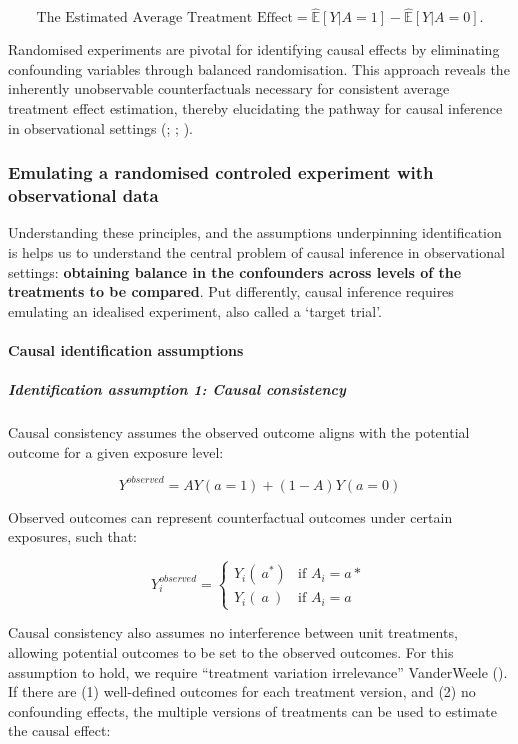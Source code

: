 \documentclass[
  singlecolumn]{article}
\let\oldparagraph\paragraph
\renewcommand{\paragraph}[1]{\oldparagraph{#1}\mbox{}}
\let\oldsubparagraph\subparagraph
\renewcommand{\subparagraph}[1]{\oldsubparagraph{#1}\mbox{}}
\begin{document}
\[
\text{The Estimated Average Treatment Effect} = \widehat{\mathbb{E}}[Y | A = 1] - \widehat{\mathbb{E}}[Y | A = 0].
\]

Randomised experiments are pivotal for identifying causal effects by
eliminating confounding variables through balanced randomisation. This
approach reveals the inherently unobservable counterfactuals necessary
for consistent average treatment effect estimation, thereby elucidating
the pathway for causal inference in observational settings
(;
;
).

\subsubsection{Emulating a randomised controled experiment with
observational
data}\label{emulating-a-randomised-controled-experiment-with-observational-data}

Understanding these principles, and the assumptions underpinning
identification is helps us to understand the central problem of causal
inference in observational settings: \textbf{obtaining balance in the
confounders across levels of the treatments to be compared}. Put
differently, causal inference requires emulating an idealised
experiment, also called a `target trial'.

\paragraph{Causal identification
assumptions}\label{causal-identification-assumptions}

\subparagraph{Identification assumption 1: Causal
consistency}\label{identification-assumption-1-causal-consistency}

Causal consistency assumes the observed outcome aligns with the
potential outcome for a given exposure level:

\[Y^{observed} = AY(a=1) + (1-A)Y(a=0)\]

Observed outcomes can represent counterfactual outcomes under certain
exposures, such that:

\[
Y^{observed}_i = 
\begin{cases} 
Y_i(~a^*) & \text{if } A_i = a* \\
Y_i(~a~) & \text{if } A_i = a
\end{cases}
\]

Causal consistency also assumes no interference between unit treatments,
allowing potential outcomes to be set to the observed outcomes. For this
assumption to hold, we require ``treatment variation irrelevance''
VanderWeele (). If there are (1)
well-defined outcomes for each treatment version, and (2) no confounding
effects, the multiple versions of treatments can be used to estimate the
causal effect:
\end{document}
